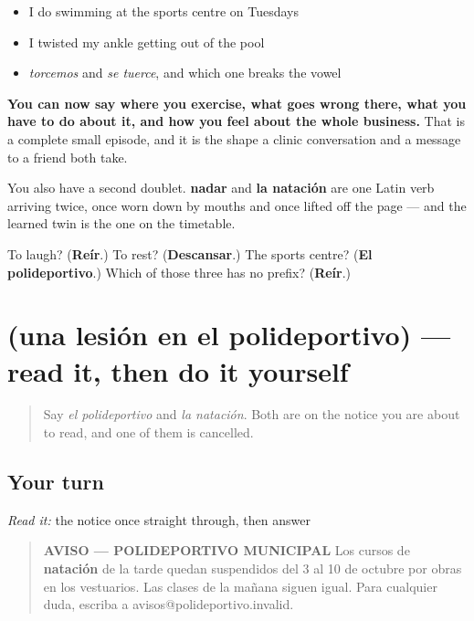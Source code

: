 \begin{itemize}
\raggedright
  \item I do swimming at the sports centre on Tuesdays
  \item I twisted my ankle getting out of the pool
  \item \emph{torcemos} and \emph{se tuerce}, and which one breaks the vowel
\end{itemize}

\begin{grammarlens}[title={What you've built}]
\textbf{You can now say where you exercise, what goes wrong there, what you have to do about it, and how you feel about the whole business.} That is a complete small episode, and it is the shape a clinic conversation and a message to a friend both take.

You also have a second doublet. \textbf{nadar} and \textbf{la natación} are one Latin verb arriving twice, once worn down by mouths and once lifted off the page — and the learned twin is the one on the timetable.
\end{grammarlens}

\begin{tcolorbox}[breakable,colback=teal!4,colframe=teal!35!black,title={Before you move on}]
To laugh? (\textbf{Reír}.) To rest? (\textbf{Descansar}.) The sports centre? (\textbf{El polideportivo}.) Which of those three has no prefix? (\textbf{Reír}.)
\end{tcolorbox}
\section[Practice]{(una lesión en el polideportivo) — read it, then do it yourself}

\label{lesson:ES-C438-sintesis-cuerpo}



\begin{quote}
Say \emph{el polideportivo} and \emph{la natación}. Both are on the notice you are about to read, and one of them is cancelled.
\end{quote}

\subsection*{Your turn}
\emph{Read it:} the notice once straight through, then answer

\begin{quote}
\textbf{AVISO — POLIDEPORTIVO MUNICIPAL} Los cursos de \textbf{natación} de la tarde quedan suspendidos del 3 al 10 de octubre por obras en los vestuarios. Las clases de la mañana siguen igual. Para cualquier duda, escriba a avisos@polideportivo.invalid.
\end{quote}

